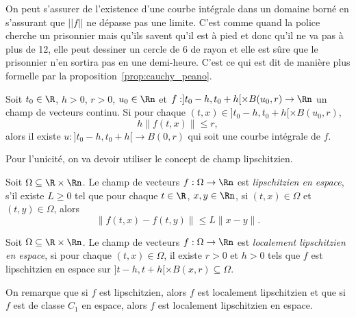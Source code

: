 On peut s'assurer de l'existence d'une courbe intégrale dans un domaine
borné en s'assurant que $||f||$ ne dépasse pas une limite.
C'est comme quand la police cherche un prisonnier mais qu'ils savent
qu'il est à pied et donc qu'il ne va pas à plus de
\si{12}{\kilo\meter\per\hour}, elle peut dessiner un cercle de
\si{6}{\kilo\meter} de rayon
et elle est sûre que le prisonnier n'en sortira pas en
une demi-heure.
C'est ce qui est dit de manière plus formelle par
la proposition~\ref{prop:cauchy_peano}.
\begin{myprop}
  \label{prop:cauchy_peano}
  Soit $t_0 \in \R$, $h > 0$, $r > 0$,
  $u_0 \in \Rn$ et $f:]t_0-h,t_0+h[\times B(u_0,r)\to\Rn$ un champ de vecteurs
  continu.
  Si pour chaque $(t,x) \in ]t_0-h,t_0+h[ \times B(u_0,r)$,
  \[ h\|f(t,x)\| \leq r, \]
  alors il existe $u:]t_0-h,t_0+h[ \to B(0,r)$
  qui soit une courbe intégrale de $f$.
\end{myprop}

Pour l'unicité, on va devoir utiliser le concept de champ lipschitzien.
\begin{mydef}
  Soit $\Omega \subseteq \R \times \Rn$.
  Le champ de vecteurs $f:\Omega\to\Rn$ est \emph{lipschitzien
  en espace}, s'il existe $L \geq 0$ tel que pour chaque
  $t\in\R$, $x,y\in\Rn$, si $(t,x) \in \Omega$ et $(t,y) \in \Omega$, alors
  \[ \|f(t,x) - f(t,y)\| \leq L \|x - y\|. \]
\end{mydef}
\begin{mydef}
  Soit $\Omega \subseteq \R \times \Rn$.
  Le champ de vecteurs $f:\Omega\to\Rn$ est \emph{localement lipschitzien
  en espace}, si pour chaque
  $(t,x) \in \Omega$,
  il existe $r > 0$ et $h > 0$ tels que
  $f$ est lipschitzien en espace sur
  $]t-h,t+h[ \times B(x,r) \subseteq \Omega$.
\end{mydef}
On remarque que si $f$ est lipschitzien, alors $f$ est localement lipschitzien
et que si $f$ est de classe $C_1$ en espace, alors $f$ est localement
lipschitzien en espace.

